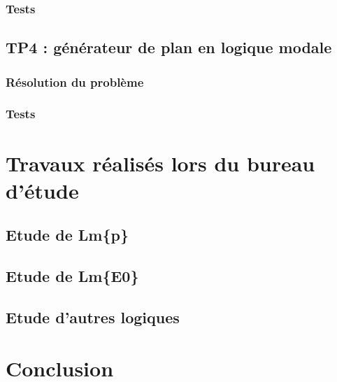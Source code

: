\documentclass[a4paper,10pt]{article}
\begin{document}
   \subsubsection{Tests}
   
  \subsection{TP4 : g\'{e}n\'{e}rateur de plan en logique modale}
  
   \subsubsection{R\'{e}solution du probl\`{e}me}
   \subsubsection{Tests}
   
   
 \section{Travaux r\'{e}alis\'{e}s lors du bureau d'\'{e}tude}
 
  \subsection{Etude de Lm\{p\} }
  
  \subsection{Etude de Lm\{E0\}}
  
  \subsection{Etude d'autres logiques}
  
 \section{Conclusion}
    
\end{document}
